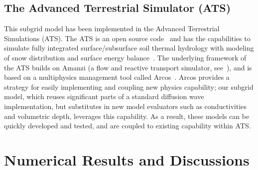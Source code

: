 %
\subsection{The Advanced Terrestrial Simulator (ATS)}\label{ATS}
This subgrid model has been implemented in the Advanced Terrestrial Simulations (ATS).
The ATS is an open source code~\citet{ats-website} and has the capabilities to simulate fully integrated surface/subsurface soil thermal hydrology with modeling of snow distribution and surface energy balance~\citet{spainter2016integrated, atchley2015}.
The underlying framework of the ATS builds on Amanzi (a flow and reactive transport simulator, see~\citet{moulton2012high}), and is based on a multiphysics management tool called Arcos~\citet{ecoon2016managing}.
Arcos provides a strategy for easily implementing and coupling new physics capability; our subgrid model, which reuses significant parts of a standard diffusion wave implementation, but substitutes in new model evaluators such as conductivities and volumetric depth, leverages this capability.
As a result, these models can be quickly developed and tested, and are coupled to existing capability within ATS.


%
\section{Numerical Results and Discussions}\label{numerical-tests}
\FloatBarrier

